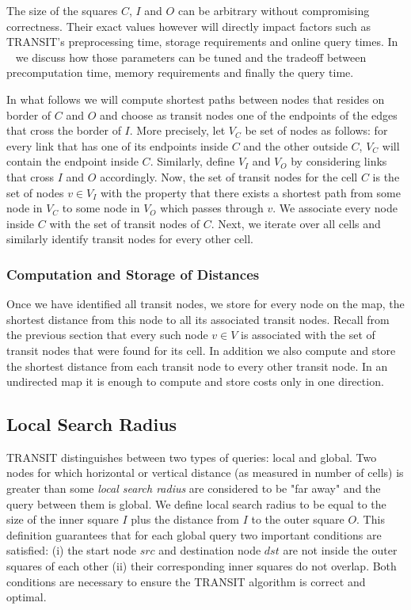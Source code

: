 \documentclass[runningheads,a4paper]{llncs}
\begin{document}
The size of the squares $C$, $I$ and $O$ can be arbitrary without compromising correctness. Their exact
values however will directly impact factors such as TRANSIT's preprocessing time, storage requirements and
online query times. In ~\cite{leon_daniel} we discuss how those parameters can be tuned and the tradeoff
between precomputation time, memory requirements and finally the query time.

In what follows we will compute shortest paths between nodes that resides on border of $C$ and $O$ and choose as
transit nodes one of the endpoints of the edges that cross the border of $I$. More precisely,
let $V_C$ be set of nodes as follows: for every link that has one of its endpoints inside $C$ and the other outside $C$,
$V_C$ will contain the endpoint inside $C$. Similarly, define $V_{I}$ and $V_{O}$ by considering links that cross $I$ and $O$ accordingly.
Now, the set of transit nodes for the cell $C$ is the set of nodes $v \in V_{I}$ with the property that there exists a shortest path from
some node in $V_C$ to some node in $V_{O}$ which passes through $v$. We associate every node inside $C$ with the
set of transit nodes of $C$. Next, we iterate over all cells and similarly identify transit nodes for every other cell.

\subsubsection{Computation and Storage of Distances}
\label{sub:precompute}
Once we have identified all transit nodes, we store for every node on the map, the shortest distance
from this node to all its associated transit nodes.  Recall from the previous section that every
such node $v \in V$ is associated with the set of transit nodes that were found for its cell.  In
addition we also compute and store the shortest distance from each transit node to every other
transit node.  In an undirected map it is enough to compute and store costs only in one direction.

\subsection {Local Search Radius}
\label{sub:local_radius}
TRANSIT distinguishes between two types of queries: local and global.  Two nodes for which
horizontal or vertical distance (as measured in number of cells) is greater than some \emph{local search
radius} are considered to be "far away" and the query between them is global.  We define
local search radius to be equal to the size of the inner square $I$ plus the distance from $I$ to the
outer square $O$.
This definition guarantees that for each global query two important conditions are satisfied:
 (i) the start node $src$ and destination node $dst$ are not inside the outer squares of each other
(ii) their corresponding inner squares do not overlap.
Both conditions are necessary to ensure the TRANSIT algorithm is correct and optimal.
\end{document}
